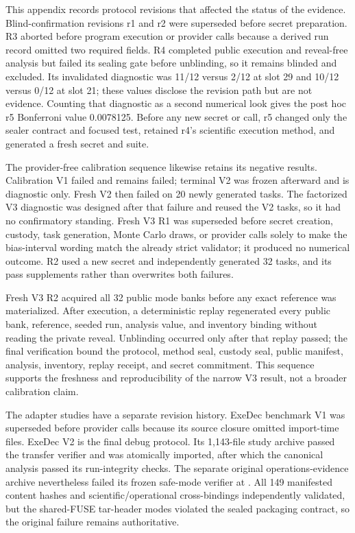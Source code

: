 \documentclass[twoside,11pt]{article}
\begin{document}
This appendix records protocol revisions that affected the status of the
evidence. Blind-confirmation revisions r1 and r2 were superseded before secret
preparation. R3 aborted before program execution or provider calls because a
derived run record omitted two required fields. R4 completed public execution
and reveal-free analysis but failed its sealing gate before unblinding, so it
remains blinded and excluded. Its invalidated diagnostic was 11/12 versus 2/12
at slot 29 and 10/12 versus 0/12 at slot 21; these values disclose the revision
path but are not evidence. Counting that diagnostic as a second numerical look
gives the post hoc r5 Bonferroni value 0.0078125. Before any new secret or call,
r5 changed only the sealer contract and focused test, retained r4's scientific
execution method, and generated a fresh secret and suite.

The provider-free calibration sequence likewise retains its negative results.
Calibration V1 failed and remains failed; terminal V2 was frozen afterward and
is diagnostic only. Fresh V2 then failed on 20 newly generated tasks. The
factorized V3 diagnostic was designed after that failure and reused the V2
tasks, so it had no confirmatory standing. Fresh V3 R1 was superseded before
secret creation, custody, task generation, Monte Carlo draws, or provider calls
solely to make the bias-interval wording match the already strict validator; it
produced no numerical outcome. R2 used a new secret and independently generated
32 tasks, and its pass supplements rather than overwrites both failures.

Fresh V3 R2 acquired all 32 public mode banks before any exact reference was
materialized. After execution, a deterministic replay regenerated every public
bank, reference, seeded run, analysis value, and inventory binding without
reading the private reveal. Unblinding occurred only after that replay passed;
the final verification bound the protocol, method seal, custody seal, public
manifest, analysis, inventory, replay receipt, and secret commitment. This
sequence supports the freshness and reproducibility of the narrow V3 result,
not a broader calibration claim.

The adapter studies have a separate revision history. ExeDec benchmark V1 was
superseded before provider calls because its source closure omitted import-time
files. ExeDec V2 is the final debug protocol. Its 1,143-file study archive
passed the transfer verifier and was atomically imported, after which the
canonical analysis passed its run-integrity checks. The separate original
operations-evidence archive nevertheless failed its frozen safe-mode verifier
at . All 149 manifested content
hashes and scientific/operational cross-bindings independently validated, but
the shared-FUSE tar-header modes violated the sealed packaging contract, so the
original failure remains authoritative.
\end{document}
